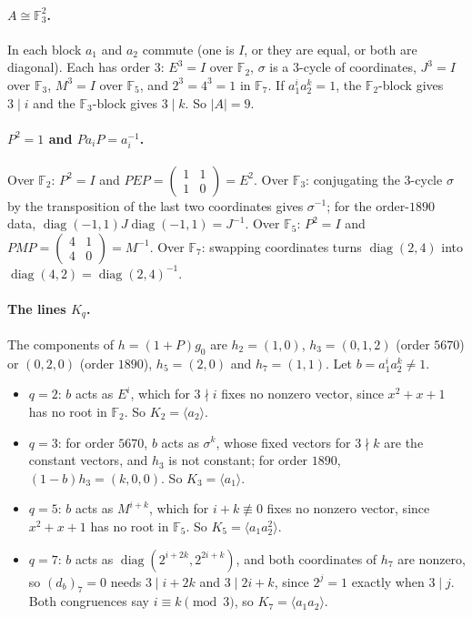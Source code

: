 \documentclass[11pt]{article}
\newcommand{\F}{\mathbb{F}}
\begin{document}
\begin{appendices}
\paragraph{$A\cong\F_3^2$.} In each block $a_1$ and $a_2$ commute (one is
$I$, or they are equal, or both are diagonal). Each has order $3$:
$E^3=I$ over $\F_2$, $\sigma$ is a $3$-cycle of coordinates, $J^3=I$ over
$\F_3$, $M^3=I$ over $\F_5$, and $2^3=4^3=1$ in $\F_7$. If $a_1^ia_2^k=1$,
the $\F_2$-block gives $3\mid i$ and the $\F_3$-block gives $3\mid k$. So
$|A|=9$.

\paragraph{$P^2=1$ and $Pa_iP=a_i^{-1}$.} Over $\F_2$: $P^2=I$ and
$PEP=\left(\begin{smallmatrix}1&1\\1&0\end{smallmatrix}\right)=E^2$. Over
$\F_3$: conjugating the $3$-cycle $\sigma$ by the transposition of the last
two coordinates gives $\sigma^{-1}$; for the order-$1890$ data,
$\operatorname{diag}(-1,1)J\operatorname{diag}(-1,1)=J^{-1}$. Over $\F_5$:
$P^2=I$ and $PMP=\left(\begin{smallmatrix}4&1\\4&0\end{smallmatrix}\right)=
M^{-1}$. Over $\F_7$: swapping coordinates turns $\operatorname{diag}(2,4)$
into $\operatorname{diag}(4,2)=\operatorname{diag}(2,4)^{-1}$.

\paragraph{The lines $K_q$.} The components of $h=(1+P)g_0$ are
$h_2=(1,0)$, $h_3=(0,1,2)$ (order $5670$) or $(0,2,0)$ (order $1890$),
$h_5=(2,0)$ and $h_7=(1,1)$. Let $b=a_1^ia_2^k\ne1$.
\begin{itemize}
\item $q=2$: $b$ acts as $E^i$, which for $3\nmid i$ fixes no nonzero
vector, since $x^2+x+1$ has no root in $\F_2$. So $K_2=\langle a_2\rangle$.
\item $q=3$: for order $5670$, $b$ acts as $\sigma^k$, whose fixed vectors
for $3\nmid k$ are the constant vectors, and $h_3$ is not constant; for
order $1890$, $(1-b)h_3=(k,0,0)$. So $K_3=\langle a_1\rangle$.
\item $q=5$: $b$ acts as $M^{i+k}$, which for $i+k\not\equiv0$ fixes no
nonzero vector, since $x^2+x+1$ has no root in $\F_5$. So
$K_5=\langle a_1a_2^2\rangle$.
\item $q=7$: $b$ acts as $\operatorname{diag}(2^{i+2k},2^{2i+k})$, and both
coordinates of $h_7$ are nonzero, so $(d_b)_7=0$ needs $3\mid i+2k$ and
$3\mid 2i+k$, since $2^j=1$ exactly when $3\mid j$. Both congruences say
$i\equiv k\pmod3$, so $K_7=\langle a_1a_2\rangle$.
\end{itemize}


\end{appendices}
\end{document}
